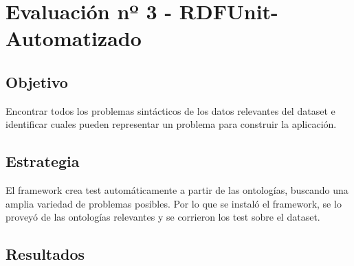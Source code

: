 \section{Evaluación nº 3 - RDFUnit-Automatizado}
\label{section:evaluacion-automatizado}

\subsection*{Objetivo}
Encontrar todos los problemas sintácticos de los datos relevantes del dataset e identificar cuales pueden representar un problema 
para construir la aplicación.

\subsection*{Estrategia}
El framework crea test automáticamente a partir de las ontologías, buscando una amplia variedad de problemas posibles. Por lo que se 
instaló el framework, se lo proveyó de las ontologías relevantes y se corrieron los test sobre el dataset.

\subsection*{Resultados}


